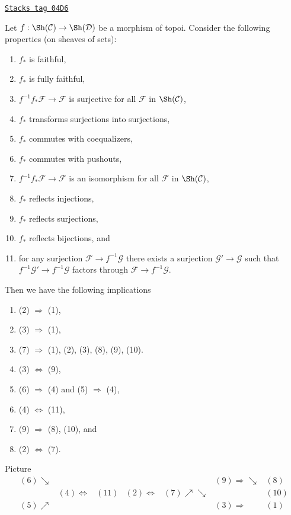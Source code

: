 \begin{lemma}
\label{sites-lemma-exactness-properties}
\href{https://stacks.math.columbia.edu/tag/04D6}{\texttt{Stacks tag 04D6}}

Let $f : \Sh(\mathcal{C}) \to \Sh(\mathcal{D})$ be
a morphism of topoi. Consider the following properties (on sheaves
of sets):
\begin{enumerate}
\item $f_*$ is faithful,
\item $f_*$ is fully faithful,
\item $f^{-1}f_*\mathcal{F} \to \mathcal{F}$ is surjective for
all $\mathcal{F}$ in $\Sh(\mathcal{C})$,
\item $f_*$ transforms surjections into surjections,
\item $f_*$ commutes with coequalizers,
\item $f_*$ commutes with pushouts,
\item $f^{-1}f_*\mathcal{F} \to \mathcal{F}$ is an isomorphism for
all $\mathcal{F}$ in $\Sh(\mathcal{C})$,
\item $f_*$ reflects injections,
\item $f_*$ reflects surjections,
\item $f_*$ reflects bijections, and
\item for any surjection $\mathcal{F} \to f^{-1}\mathcal{G}$ there
exists a surjection $\mathcal{G}' \to \mathcal{G}$ such that
$f^{-1}\mathcal{G}' \to f^{-1}\mathcal{G}$ factors through
$\mathcal{F} \to f^{-1}\mathcal{G}$.
\end{enumerate}
Then we have the following implications
\begin{enumerate}
\item[(a)] (2) $\Rightarrow$ (1),
\item[(b)] (3) $\Rightarrow$ (1),
\item[(c)] (7) $\Rightarrow$ (1), (2), (3), (8), (9), (10).
\item[(d)] (3) $\Leftrightarrow$ (9),
\item[(e)] (6) $\Rightarrow$ (4) and (5) $\Rightarrow$ (4),
\item[(f)] (4) $\Leftrightarrow$ (11),
\item[(g)] (9) $\Rightarrow$ (8), (10), and
\item[(h)] (2) $\Leftrightarrow$ (7).
\end{enumerate}
Picture
$$
\begin{array}{ccccccc}(6) \searrow &  &  &  &  & (9) \Longrightarrow\searrow & (8) \\  & (4) \Longleftrightarrow & (11) & (2) \Longleftrightarrow & (7) \nearrow\searrow &  & (10) \\ (5) \nearrow &  &  &  &  & (3) \Longrightarrow & (1)\end{array}
$$
\end{lemma}

